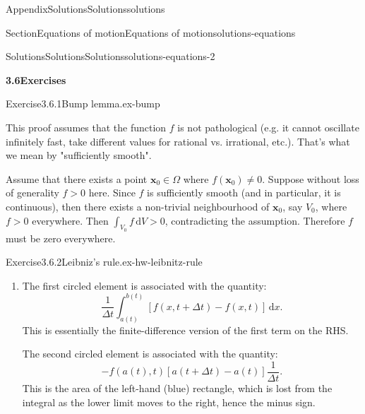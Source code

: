 \documentclass[oneside,10pt,]{book}
\numberwithin{equation}{section}
\newcommand{\de}{\mathrm{d}}
\newcommand{\bx}{\boldsymbol{x}}
\begin{document}
\begin{appendixptx}{Appendix}{Solutions}{}{Solutions}{}{}{solutions}
\typeout{************************************************}
%
\begin{sectionptx}{Section}{Equations of motion}{}{Equations of motion}{}{}{solutions-equations}
%
%
\typeout{************************************************}
\typeout{************************************************}
%
\begin{solutions-subsection-numberless}{Solutions}{Solutions}{}{Solutions}{}{}{solutions-equations-2}
\par\medskip
\noindent\textbf{\normalsize{}3.6\space\textperiodcentered\space{}Exercises}
\begin{divisionsolution}{Exercise}{3.6.1}{Bump lemma.}{ex-bump}%
\par\smallskip%
\noindent\hypertarget{ex-bump-3-main}{}This proof assumes that the function \(f\) is not pathological (e.g. it cannot oscillate infinitely fast, take different values for rational vs. irrational, etc.). That's what we mean by "sufficiently smooth".%
\par
Assume that there exists a point \(\bx_0 \in \Omega\) where \(f(\bx_0) \neq 0\). Suppose without loss of generality \(f > 0\) here. Since \(f\) is sufficiently smooth (and in particular, it is continuous), then there exists a non-trivial neighbourhood of \(\bx_0\), say \(V_0\), where \(f > 0\) everywhere. Then \(\int_{V_0}
f \, \de{V} > 0\), contradicting the assumption. Therefore \(f\) must be zero everywhere.%
\end{divisionsolution}%
\begin{divisionsolution}{Exercise}{3.6.2}{Leibniz's rule.}{ex-hw-leibnitz-rule}%
\begin{enumerate}[font=\bfseries,label=(\alph*),ref=\alph*]%
\item[(a)]\noindent\hypertarget{ex-hw-leibnitz-rule-3-2-main}{}The first circled element is associated with the quantity:%
\begin{equation*}
\frac{1}{\Delta t} \int_{a(t)}^{b(t)} [f(x, t + \Delta t) - f(x, t)] \, \de{x}.
\end{equation*}
This is essentially the finite-difference version of the first term on the RHS.%
\par
The second circled element is associated with the quantity:%
\begin{equation*}
-f(a(t), t)[a(t + \Delta t) - a(t)] \frac{1}{\Delta t}.
\end{equation*}
This is the area of the left-hand (blue) rectangle, which is lost from the integral as the lower limit moves to the right, hence the minus sign.%

\end{enumerate}
\end{divisionsolution}
\end{solutions-subsection-numberless}
\end{sectionptx}
\end{appendixptx}
\end{document}
